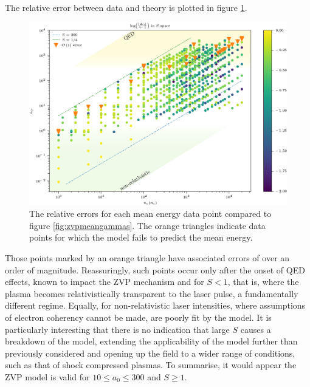 The relative error between data and theory is plotted in figure \ref{fig:zvp-logabserrortedit}. 
\begin{figure}
	\centering
	\includegraphics[width=1\linewidth]{figures/zvp/log_abs_error_T_edit}
	\caption[The relative errors for each mean energy data point compared to figure \ref{fig:zvpmeangammas}.]{The relative errors for each mean energy data point compared to figure \ref{fig:zvpmeangammas}. The orange triangles indicate data points for which the model fails to predict the mean energy.}
	\label{fig:zvp-logabserrortedit}
\end{figure}
Those points marked by an orange triangle have associated errors of over an order of magnitude. Reassuringly, such points occur only after the onset of QED effects, known to impact the ZVP mechanism \cite{savinEnergyAbsorptionLaserQED2019} and for $S<1$, that is, where the plasma becomes relativistically transparent to the laser pulse, a fundamentally different regime. Equally, for non-relativistic laser intensities, where assumptions of electron coherency cannot be made, are poorly fit by the model. It is particularly interesting that there is no indication that large $S$ causes a breakdown of the model, extending the applicability of the model further than previously considered and opening up the field to a wider range of conditions, such as that of shock compressed plasmas. To summarise, it would appear the ZVP model is valid for $10 \le a_0 \le 300$ and $S\ge1$.

